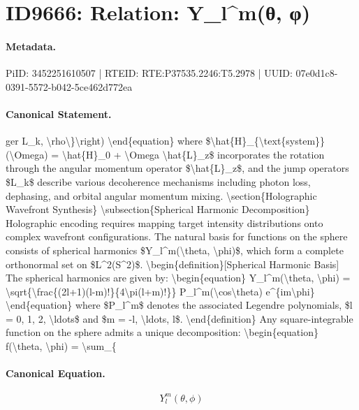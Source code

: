 \section*{ID9666: Relation: Y\_l\textasciicircum{}m(θ, φ)}
\paragraph{Metadata.}
PiID: 3452251610507 | RTEID: RTE:P37535.2246:T5.2978 | UUID: 07e0d1c8-0391-5572-b042-5ce462d772ea

\paragraph{Canonical Statement.}
ger L\_k, \textbackslash{}rho\textbackslash{}\}\textbackslash{}right) \textbackslash{}end\{equation\} where \$\textbackslash{}hat\{H\}\_\{\textbackslash{}text\{system\}\}(\textbackslash{}Omega) = \textbackslash{}hat\{H\}\_0 + \textbackslash{}Omega \textbackslash{}hat\{L\}\_z\$ incorporates the rotation through the angular momentum operator \$\textbackslash{}hat\{L\}\_z\$, and the jump operators \$L\_k\$ describe various decoherence mechanisms including photon loss, dephasing, and orbital angular momentum mixing. \textbackslash{}section\{Holographic Wavefront Synthesis\} \textbackslash{}subsection\{Spherical Harmonic Decomposition\} Holographic encoding requires mapping target intensity distributions onto complex wavefront configurations. The natural basis for functions on the sphere consists of spherical harmonics \$Y\_l\textasciicircum{}m(\textbackslash{}theta, \textbackslash{}phi)\$, which form a complete orthonormal set on \$L\textasciicircum{}2(S\textasciicircum{}2)\$. \textbackslash{}begin\{definition\}[Spherical Harmonic Basis] The spherical harmonics are given by: \textbackslash{}begin\{equation\} Y\_l\textasciicircum{}m(\textbackslash{}theta, \textbackslash{}phi) = \textbackslash{}sqrt\{\textbackslash{}frac\{(2l+1)(l-m)!\}\{4\textbackslash{}pi(l+m)!\}\} P\_l\textasciicircum{}m(\textbackslash{}cos\textbackslash{}theta) e\textasciicircum{}\{im\textbackslash{}phi\} \textbackslash{}end\{equation\} where \$P\_l\textasciicircum{}m\$ denotes the associated Legendre polynomials, \$l = 0, 1, 2, \textbackslash{}ldots\$ and \$m = -l, \textbackslash{}ldots, l\$. \textbackslash{}end\{definition\} Any square-integrable function on the sphere admits a unique decomposition: \textbackslash{}begin\{equation\} f(\textbackslash{}theta, \textbackslash{}phi) = \textbackslash{}sum\_\{

\paragraph{Canonical Equation.}
\[
Y_l^m(\theta, \phi)
\]

